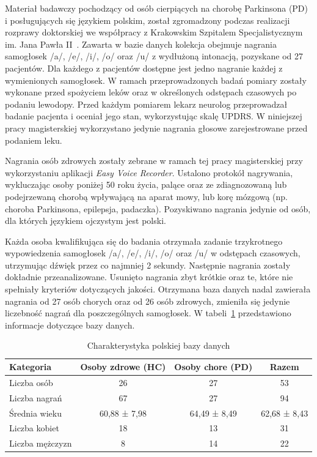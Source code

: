 Materiał badawczy pochodzący od osób cierpiących na chorobę Parkinsona (PD) i posługujących się językiem polskim, został zgromadzony podczas
realizacji rozprawy doktorskiej we współpracy z Krakowskim Szpitalem Specjalistycznym im.
Jana Pawła II~\cite{daria:2018}.
Zawarta w bazie danych kolekcja obejmuje nagrania samogłosek /a/, /e/, /i/, /o/ oraz /u/ z wydłużoną intonacją, pozyskane od 27 pacjentów.
Dla każdego z pacjentów dostępne jest jedno nagranie każdej z wymienionych samogłosek.
W ramach przeprowadzonych badań pomiary zostały wykonane przed spożyciem leków oraz w określonych odstępach czasowych po podaniu lewodopy.
Przed każdym pomiarem lekarz neurolog przeprowadzał badanie pacjenta i oceniał jego stan, wykorzystując skalę UPDRS\@.
W niniejszej pracy magisterskiej wykorzystano jedynie nagrania głosowe zarejestrowane przed podaniem leku.

Nagrania osób zdrowych zostały zebrane w ramach tej pracy magisterskiej przy wykorzystaniu aplikacji \emph{Easy Voice Recorder}.
Ustalono protokół nagrywania, wykluczając osoby poniżej 50 roku życia, palące oraz ze zdiagnozowaną lub podejrzewaną chorobą wpływającą na aparat mowy, lub korę mózgową (np.
choroba Parkinsona, epilepsja, padaczka).
Pozyskiwano nagrania jedynie od osób, dla których językiem ojczystym jest polski.

Każda osoba kwalifikująca się do badania otrzymała zadanie trzykrotnego wypowiedzenia samogłosek /a/, /e/, /i/, /o/ oraz /u/ w odstępach czasowych, utrzymując dźwięk przez co najmniej 2 sekundy.
Następnie nagrania zostały dokładnie przeanalizowane.
Usunięto nagrania zbyt krótkie oraz te, które nie spełniały kryteriów dotyczących jakości.
Otrzymana baza danych nadal zawierała nagrania od 27 osób chorych oraz od 26 osób zdrowych, zmieniła się jedynie liczebność nagrań dla poszczególnych samogłosek.
W tabeli~\ref{tab:polish_database} przedstawiono informacje dotyczące bazy danych.

\begin{table}[h]
\centering
\caption{Charakterystyka polskiej bazy danych}
\label{tab:polish_database}
\begin{tabular}{|l|c|c|c|}
\hline
\textbf{Kategoria} &\textbf{Osoby zdrowe (HC)} &\textbf{Osoby chore (PD)} &\textbf{Razem} \\ \hline
Liczba osób &26 &27 &53\\ \hline
Liczba nagrań &67 &27 &94\\ \hline
Średnia wieku &60,88 ± 7,98 &64,49 ± 8,49  &62,68 ± 8,43\\ \hline
Liczba kobiet &18 &13 &31\\ \hline
Liczba mężczyzn &8 &14 &22 \\ \hline
\end{tabular}
\end{table}

